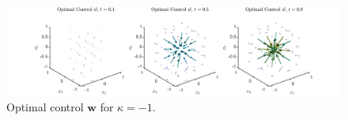 \documentclass[11pt, a4paper]{article}
\theoremstyle{definition}
\newcommand{\w}{\mathbf{w}}
\begin{document}
	\begin{figure}[h]
		\centering
		\includegraphics[scale=0.35]{Controlkn1.png}
		\caption{Optimal control $\w$ for $\kappa = -1$.} 
		\label{F7}
	\end{figure}
%	
%	
%	
	
\end{document}
